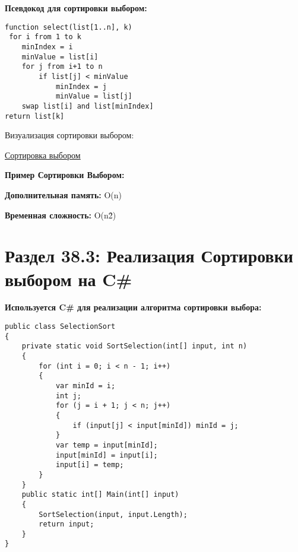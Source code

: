 \vspace{\baselineskip}
\textbf{Псевдокод для сортировки выбором:}

\vspace{\baselineskip}
\begin{tcolorbox}
\begin{verbatim} 
function select(list[1..n], k)
 for i from 1 to k
	minIndex = i
	minValue = list[i]
	for j from i+1 to n
		if list[j] < minValue
			minIndex = j
			minValue = list[j]
	swap list[i] and list[minIndex]
return list[k]

\end{verbatim}
\end{tcolorbox}

\vspace{\baselineskip}
Визуализация сортировки выбором:

\vspace{\baselineskip}
\href{https://i.stack.imgur.com/LZepY.gif}{\underline{Сортировка выбором}}

\vspace{\baselineskip}
\textbf{Пример Сортировки Выбором:}

\newpage

\vspace{\baselineskip}

\vspace{\baselineskip}
\textbf{Дополнительная память:} O(n)

\textbf{Временная сложность:} O(n\^2)

\section*{Раздел 38.3: Реализация Сортировки выбором на C\#}

\textbf{Используется C\# для реализации алгоритма сортировки выбора:}

\vspace{\baselineskip}
\begin{tcolorbox}
\begin{verbatim} 
public class SelectionSort
{
	private static void SortSelection(int[] input, int n)
	{
		for (int i = 0; i < n - 1; i++)
		{
			var minId = i;
			int j;
			for (j = i + 1; j < n; j++)
			{
				if (input[j] < input[minId]) minId = j;
			}
			var temp = input[minId];
			input[minId] = input[i];
			input[i] = temp;
		}
	}
	public static int[] Main(int[] input)
	{
		SortSelection(input, input.Length);
		return input;
	}
}
\end{verbatim}
\end{tcolorbox}
